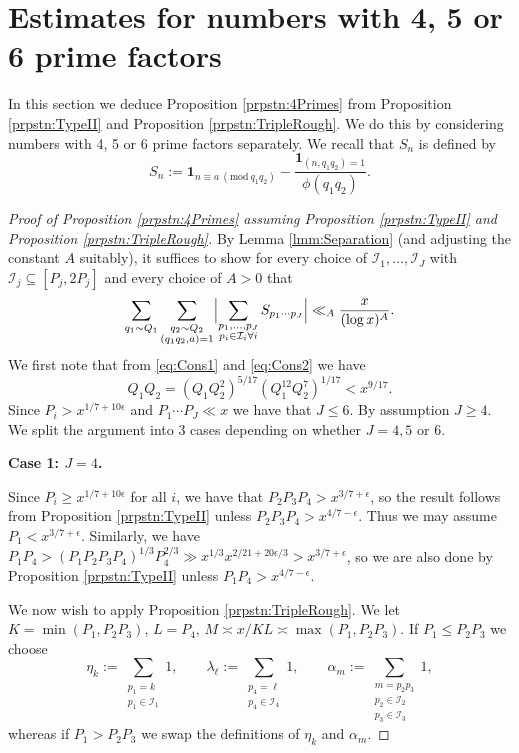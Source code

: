 \documentclass[10pt]{amsart}
\theoremstyle{plain}
\numberwithin{equation}{section}
\newcommand{\Mod}[1]{\ (\mathrm{mod}\ #1)}
\begin{document}
\section{Estimates for numbers with 4, 5 or 6 prime factors}\label{sec:4Primes}
%
%
%
%
In this section we deduce Proposition \ref{prpstn:4Primes} from Proposition \ref{prpstn:TypeII} and Proposition \ref{prpstn:TripleRough}. We do this by considering numbers with 4, 5 or 6 prime factors separately. %
%
%
We recall that $S_n$ is defined by
\[
S_n:=\mathbf{1}_{n\equiv a\Mod{q_1q_2}}-\frac{\mathbf{1}_{(n,q_1q_2)=1}}{\phi(q_1q_2)}.
\]
%
%
%
%
%
%
%
%
\begin{proof}[Proof of Proposition \ref{prpstn:4Primes} assuming Proposition \ref{prpstn:TypeII} and Proposition \ref{prpstn:TripleRough}]

By Lemma \ref{lmm:Separation} (and adjusting the constant $A$ suitably), it suffices to show for every choice of $\mathcal{I}_1,\dots,\mathcal{I}_J$ with $\mathcal{I}_j\subseteq[P_j,2P_j]$ and every choice of $A>0$ that
\[
\sum_{q_1\sim Q_1}\sum_{\substack{q_2\sim Q_2\\ (q_1q_2,a)=1}}\Bigl|\sum_{\substack{p_1,\dots,p_J\\ p_i\in \mathcal{I}_i\forall i}}S_{p_1\cdots p_J}\Bigr|\ll_{A}\frac{x}{(\log{x})^A}.
\]
We first note that from \eqref{eq:Cons1} and \eqref{eq:Cons2} we have
\[
Q_1Q_2=(Q_1Q_2^2)^{5/17}(Q_1^{12}Q_2^{7})^{1/17}<x^{9/17}.
\]
Since $P_i>x^{1/7+10\epsilon}$ and $P_1\cdots P_J\ll x$ we have that $J\le 6$. By assumption $J\ge 4$. We split the argument into 3 cases depending on whether $J=4,5$ or $6$.

\medskip

\textbf{Case 1: $J=4$.}

Since $P_i\ge x^{1/7+10\epsilon}$ for all $i$, we have that $P_2P_3P_4>x^{3/7+\epsilon}$, so the result follows from Proposition \ref{prpstn:TypeII} unless $P_2P_3P_4>x^{4/7-\epsilon}$. Thus we may assume $P_1<x^{3/7+\epsilon}$. Similarly, we have $P_1P_4>(P_1P_2P_3P_4)^{1/3}P_4^{2/3}\gg x^{1/3}x^{2/21+20\epsilon/3}>x^{3/7+\epsilon}$, so we are also done by Proposition \ref{prpstn:TypeII} unless $P_1P_4>x^{4/7-\epsilon}$.

We now wish to apply Proposition \ref{prpstn:TripleRough}. We let $K=\min(P_1,P_2P_3)$, $L=P_4$, $M\asymp x/KL\asymp\max(P_1,P_2P_3)$. If $P_1\le P_2P_3$ we choose
\[
\eta_k:=\sum_{\substack{p_1=k\\ p_1\in\mathcal{I}_1}}1,\qquad \lambda_\ell:=\sum_{\substack{p_4=\ell\\ p_4\in\mathcal{I}_4}}1,\qquad\alpha_m:=\sum_{\substack{m=p_2p_3\\ p_2\in\mathcal{I}_2\\ p_3\in\mathcal{I}_3}}1,
\]
whereas if $P_1>P_2P_3$ we swap the definitions of $\eta_k$ and $\alpha_m$.


\end{proof}
\end{document}
